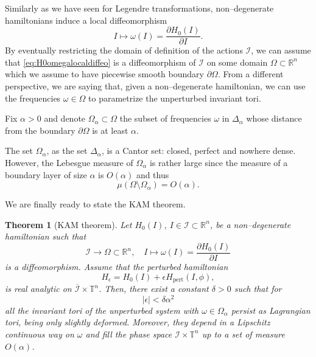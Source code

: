 \documentclass[english,fontsize=11pt,paper=b5]{scrbook}
\newtheorem{theorem}{Theorem}[chapter]
\theoremstyle{definition}
\begin{document}
      Similarly as we have seen for Legendre transformations, non--degenerate hamiltonians induce a local diffeomorphism
      \begin{equation}\label{eq:H0omegalocaldiffeo}
        I \mapsto \omega(I) = \frac{\partial H_0(I)}{\partial I}.
      \end{equation}
      By eventually restricting the domain of definition of the actions $\mathcal{I}$, we can assume that \eqref{eq:H0omegalocaldiffeo} is a diffeomorphism of $\mathcal{I}$ on some domain $\Omega\subset\mathbb{R}^n$ which we assume to have piecewise smooth boundary $\partial\Omega$.
      From a different perspective, we are saying that, given a non--degenerate hamiltonian, we can use the frequencies $\omega\in\Omega$ to parametrize the unperturbed invariant tori.

      Fix $\alpha >0$ and denote $\Omega_\alpha\subset\Omega$ the subset of frequencies $\omega$ in $\Delta_\alpha$ whose distance from the boundary $\partial\Omega$ is at least $\alpha$.

      The set $\Omega_\alpha$, as the set $\Delta_\alpha$, is a Cantor set: closed, perfect and nowhere dense. However, the Lebesgue measure of $\Omega_\alpha$ is rather large since the measure of a boundary layer of size $\alpha$ is $O(\alpha)$ and thus
      \begin{equation}
        \mu(\Omega\setminus\Omega_\alpha) = O(\alpha).
      \end{equation}

      We are finally ready to state the KAM theorem.

      \begin{theorem}[KAM theorem]
        Let $H_0(I)$, $I\in\mathcal{I}\subset\mathbb{R}^n$, be a non--degenerate hamiltonian such that
        \begin{equation}
          \mathcal{I} \to \Omega\subset\mathbb{R}^n, \quad I\mapsto \omega(I) = \frac{\partial H_0(I)}{\partial I}
        \end{equation}
        is a diffeomorphism.
        Assume that the perturbed hamiltonian
        \begin{equation}
          H_{\epsilon} = H_0(I) + \epsilon H_{\mathrm{pert}}(I,\phi),
        \end{equation}
        is real analytic on $\overline{\mathcal{I}}\times\mathbb{T}^n$.
        Then, there exist a constant $\delta >0$ such that for
        \begin{equation}
          |\epsilon| < \delta\alpha^2
        \end{equation}
        all the invariant tori of the unperturbed system with $\omega\in\Omega_\alpha$ persist as Lagrangian tori, being only slightly deformed. Moreover, they depend in a Lipschitz continuous way on $\omega$ and fill the phase space $\mathcal{I}\times\mathbb{T}^n$ up to a set of measure $O(\alpha)$.
      \end{theorem}
\end{document}
